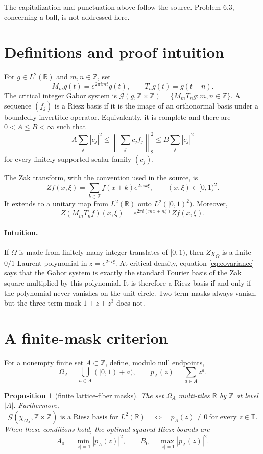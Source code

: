 \documentclass[11pt]{article}
\newtheorem{proposition}{Proposition}
\newcommand{\R}{\mathbb R}
\newcommand{\Z}{\mathbb Z}
\newcommand{\T}{\mathbb T}
\newcommand{\cG}{\mathcal G}
\begin{document}
The capitalization and punctuation above follow the source. Problem 6.3,
concerning a ball, is not addressed here.

\section{Definitions and proof intuition}

For $g\in L^2(\R)$ and $m,n\in\Z$, set
\[
  M_mg(t)=e^{2\pi i mt}g(t),\qquad T_ng(t)=g(t-n).
\]
The critical integer Gabor system is
$\cG(g,\Z\times\Z)=\{M_mT_ng:m,n\in\Z\}$.
A sequence $(f_j)$ is a Riesz basis if it is the image of an orthonormal
basis under a boundedly invertible operator. Equivalently, it is complete
and there are $0<A\leq B<\infty$ such that
\[
 A\sum_j|c_j|^2\leq\left\|\sum_jc_jf_j\right\|_2^2
 \leq B\sum_j|c_j|^2
\]
for every finitely supported scalar family $(c_j)$.

The Zak transform, with the convention used in the source, is
\[
  Zf(x,\xi)=\sum_{k\in\Z}f(x+k)e^{2\pi i k\xi},
  \qquad (x,\xi)\in[0,1)^2.
\]
It extends to a unitary map from $L^2(\R)$ onto $L^2([0,1)^2)$.
Moreover,
\begin{equation}\label{eq:covariance}
 Z(M_mT_nf)(x,\xi)=e^{2\pi i(mx+n\xi)}Zf(x,\xi).
\end{equation}

\paragraph{Intuition.}
If $\Omega$ is made from finitely many integer translates of $[0,1)$, then
$Z\chi_\Omega$ is a finite $0/1$ Laurent polynomial in
$z=e^{2\pi i\xi}$. At critical density, equation \eqref{eq:covariance}
says that the Gabor system is exactly the standard Fourier basis of the Zak
square multiplied by this polynomial. It is therefore a Riesz basis if and
only if the polynomial never vanishes on the unit circle. Two-term masks
always vanish, but the three-term mask $1+z+z^3$ does not.

\section{A finite-mask criterion}

For a nonempty finite set $A\subset\Z$, define, modulo null endpoints,
\[
  \Omega_A=\bigcup_{a\in A}([0,1)+a),
  \qquad p_A(z)=\sum_{a\in A}z^a.
\]

\begin{proposition}[finite lattice-fiber masks]\label{prop:mask}
The set $\Omega_A$ multi-tiles $\R$ by $\Z$ at level $|A|$. Furthermore,
\[
 \cG(\chi_{\Omega_A},\Z\times\Z)
 \text{ is a Riesz basis for }L^2(\R)
 \quad\Longleftrightarrow\quad
 p_A(z)\neq0\ \text{for every }z\in\T.
\]
When these conditions hold, the optimal squared Riesz bounds are
\[
 A_0=\min_{|z|=1}|p_A(z)|^2,
 \qquad B_0=\max_{|z|=1}|p_A(z)|^2.
\]
\end{proposition}
\end{document}
